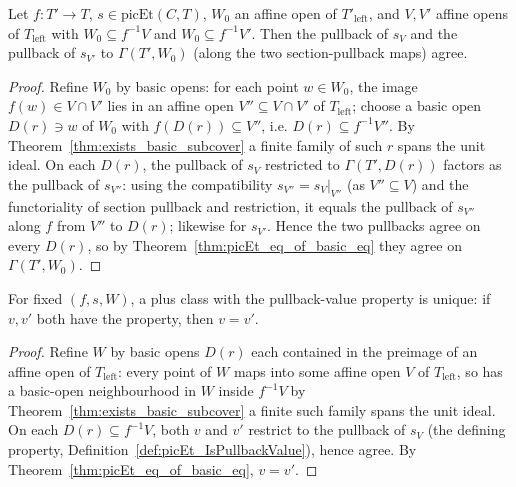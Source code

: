 \begin{theorem}
  \label{thm:picEt_mapAlg_appLE_eq}
  \leanok
  Let \(f \colon T' \to T\), \(s \in \mathrm{picEt}(C, T)\), \(W_0\) an affine open of
  \(T'_{\mathrm{left}}\), and \(V, V'\) affine opens of \(T_{\mathrm{left}}\) with \(W_0 \subseteq
  f^{-1}V\) and \(W_0 \subseteq f^{-1}V'\). Then the pullback of \(s_V\) and the pullback of
  \(s_{V'}\) to \(\Gamma(T', W_0)\) (along the two section-pullback maps) agree.
\end{theorem}
\begin{proof}
  \leanok
  Refine \(W_0\) by basic opens: for each point \(w \in W_0\), the image \(f(w) \in V \cap V'\) lies
  in an affine open \(V'' \subseteq V \cap V'\) of \(T_{\mathrm{left}}\); choose a basic open
  \(D(r) \ni w\) of \(W_0\) with \(f(D(r)) \subseteq V''\), i.e. \(D(r) \subseteq f^{-1}V''\). By
  Theorem~\ref{thm:exists_basic_subcover} a finite family of such \(r\) spans the unit ideal. On
  each \(D(r)\), the pullback of \(s_V\) restricted to \(\Gamma(T', D(r))\) factors as the pullback
  of \(s_{V''}\): using the compatibility \(s_{V''} = s_V|_{V''}\) (as \(V'' \subseteq V\)) and the
  functoriality of section pullback and restriction, it equals the pullback of \(s_{V''}\) along
  \(f\) from \(V''\) to \(D(r)\); likewise for \(s_{V'}\). Hence the two pullbacks agree on every
  \(D(r)\), so by Theorem~\ref{thm:picEt_eq_of_basic_eq} they agree on \(\Gamma(T', W_0)\).
\end{proof}

\begin{theorem}
  \label{thm:picEt_pullbackValue_unique}
  \leanok
  For fixed \((f, s, W)\), a plus class with the pullback-value property is unique: if \(v, v'\)
  both have the property, then \(v = v'\).
\end{theorem}
\begin{proof}
  \leanok
  Refine \(W\) by basic opens \(D(r)\) each contained in the preimage of an affine open of
  \(T_{\mathrm{left}}\): every point of \(W\) maps into some affine open \(V\) of
  \(T_{\mathrm{left}}\), so has a basic-open neighbourhood in \(W\) inside \(f^{-1}V\; \)by
  Theorem~\ref{thm:exists_basic_subcover} a finite such family spans the unit ideal. On each
  \(D(r) \subseteq f^{-1}V\), both \(v\) and \(v'\) restrict to the pullback of \(s_V\) (the
  defining property, Definition~\ref{def:picEt_IsPullbackValue}), hence agree. By
  Theorem~\ref{thm:picEt_eq_of_basic_eq}, \(v = v'\).
\end{proof}

